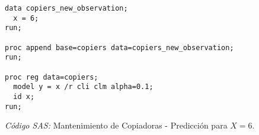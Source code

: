 \documentclass{article}
\begin{document}
    \begin{figure}[!h]
      \centering
      \begin{verbatim}
data copiers_new_observation;
  x = 6;
run;

proc append base=copiers data=copiers_new_observation;
run;

proc reg data=copiers;
  model y = x /r cli clm alpha=0.1;
  id x;
run;
      \end{verbatim}
      \caption{\emph{Código SAS:} Mantenimiento de Copiadoras - Predicción para $X = 6$.}
      \label{code:sas-copiers-4}
    \end{figure}


  \nocite{rano2017}
  \nocite{sas}
  \nocite{neter1996applied}
  \nocite{montgomery2012introduction}

  
  
\end{document}
